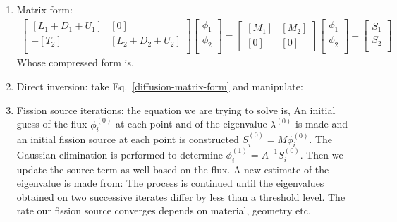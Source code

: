 \documentclass{school-22.211-notes}
\begin{document}
\begin{enumerate}
\item Matrix form: 
  \begin{align}
    \left[ \begin{array}{cc} 
        [L_1 + D_1 + U_1] & [0] \\
        -[T_2] & [L_2 + D_2 + U_2] \\
      \end{array} \right] 
    \left[ \begin{array}{c}
        \phi_1 \\ \phi_2 \\ \end{array} \right] 
    = \left[ {\begin{array}{cc} \left[M_1\right] & \left[M_2\right] \\ \left[0\right] & \left[0\right] \end{array}} \right] 
    \left[ \begin{array}{c}
        \phi_1 \\ \phi_2 \\ \end{array} \right] 
    + 
    \left[ \begin{array}{c} 
        S_1 \\ S_2 \\ \end{array} \right] 
  \end{align}
  Whose compressed form is, 
  \eqn{ [A] [\phi] = [M] [\phi] + [S] \label{diffusion-matrix-form} }

\item Direct inversion: take Eq.~\ref{diffusion-matrix-form} and manipulate:
  
\item Fission source iterations: the equation we are trying to solve is,
An initial guess of the flux $\phi_i^{(0)}$ at each point and of the eigenvalue $\lambda^{(0)}$ is made and an initial fission source at each point is constructed $S_i^{(0)} = M \phi_i^{(0)}$. The Gaussian elimination is performed to determine $\phi_i^{(1)} = A^{-1} S_i^{(0)}$. Then we update the source term as well based on the flux. A new estimate of the eigenvalue is made from: 
The process is continued until the eigenvalues obtained on two successive iterates differ by less than a threshold level. The rate our fission source converges depends on material, geometry etc.


\end{enumerate}
\end{document}
